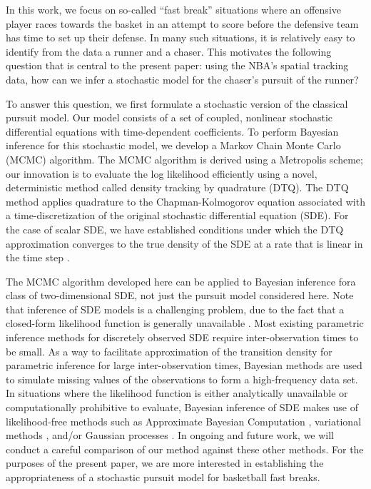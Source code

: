 \documentclass[graybox]{svmult}
\begin{document}
In this work, we focus on so-called ``fast break'' situations where an
offensive player races towards the basket in an attempt to score before the
defensive team has time to set up their defense.  In many such situations,
it is relatively easy to identify from the data a runner and a
chaser.  This motivates the following question that is central to the
present paper: using the NBA's spatial tracking data, how can we infer
a stochastic model for the chaser's pursuit of the runner?

To answer this question, we first formulate a stochastic version of
the classical pursuit model.  Our model consists of a set of coupled,
nonlinear stochastic differential equations with time-dependent
coefficients.  To perform Bayesian inference for this stochastic
model, we develop a Markov Chain Monte Carlo (MCMC) algorithm.  The
MCMC algorithm is derived using a Metropolis scheme; our innovation is
to evaluate the log likelihood efficiently using a novel, deterministic
method called density tracking by quadrature (DTQ).  The DTQ method
applies quadrature to the Chapman-Kolmogorov equation associated with
a time-discretization of the original stochastic differential equation
(SDE). For the case of scalar SDE, we have established
conditions under which the DTQ approximation converges to the true density 
of the SDE at a rate that is linear in the time step \cite{BhatMadu2016}.

The MCMC algorithm developed here can be applied to
Bayesian inference fora class of two-dimensional SDE, not just the pursuit model
considered here.  Note that inference of SDE models is a 
challenging problem, due to the fact that a closed-form likelihood
function is generally unavailable \cite{sorensen2004parametric,
  iacus2009simulation, fuchs2013inference}. Most existing parametric
inference methods for discretely observed SDE require
inter-observation times to be small.  As a way to facilitate
approximation of the transition density for parametric inference for
large inter-observation times, Bayesian methods are used to simulate
missing values of the observations to form a high-frequency data
set. In situations where the likelihood function is either
analytically unavailable or computationally prohibitive to evaluate,
Bayesian inference of SDE makes use of likelihood-free methods such as
Approximate Bayesian Computation \cite{Picchini2014}, variational
methods \cite{Archambeau2007a, Vrettas2015}, and/or Gaussian processes
\cite{Archambeau2007, Ruttor2013}.  In ongoing and future work, we
will conduct a careful comparison of our method against these other
methods.  For the purposes of the present paper, we are more
interested in establishing the appropriateness of a stochastic pursuit
model for basketball fast breaks.
\end{document}
